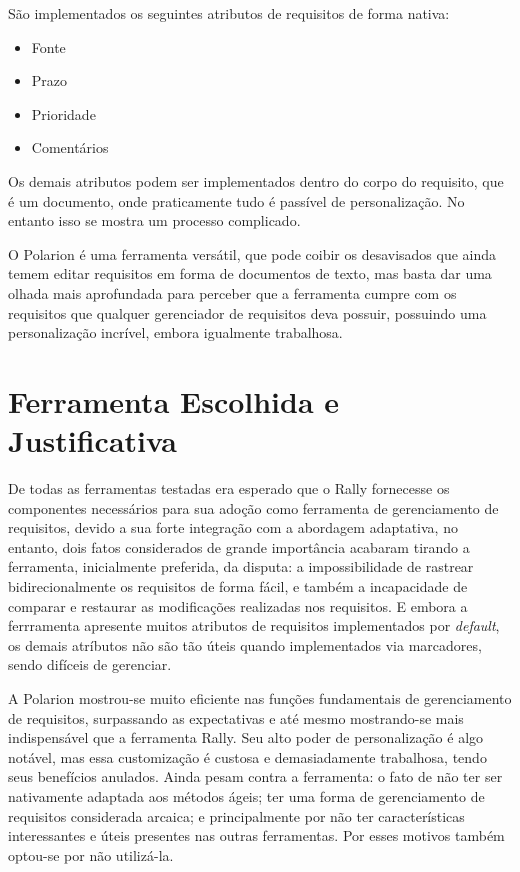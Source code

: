 São implementados os seguintes atributos de requisitos de forma nativa:

\begin{itemize}
  \item Fonte
  \item Prazo
  \item Prioridade
  \item Comentários
\end{itemize}

Os demais atributos podem ser implementados dentro do corpo do requisito, que é um documento, onde praticamente tudo é passível de personalização. No entanto isso se mostra um processo complicado.

O Polarion é uma ferramenta versátil, que pode coibir os desavisados que ainda temem editar requisitos em forma de documentos de texto, mas basta dar uma olhada mais aprofundada para perceber que a ferramenta cumpre com os requisitos que qualquer gerenciador de requisitos deva possuir, possuindo uma personalização incrível, embora igualmente trabalhosa.

\section{Ferramenta Escolhida e Justificativa}

De todas as ferramentas testadas era esperado que o Rally fornecesse os componentes necessários para sua adoção como ferramenta de gerenciamento de requisitos, devido a sua forte integração com a abordagem adaptativa, no entanto, dois fatos considerados de grande importância acabaram tirando a ferramenta, inicialmente preferida, da disputa: a impossibilidade de rastrear bidirecionalmente os requisitos de forma fácil, e também a incapacidade de comparar e restaurar as modificações realizadas nos requisitos. E embora a ferrramenta apresente muitos atributos de requisitos implementados por \emph{default}, os demais atríbutos não são tão úteis quando implementados via marcadores, sendo difíceis de gerenciar.

A Polarion mostrou-se muito eficiente nas funções fundamentais de gerenciamento de requisitos, surpassando as expectativas e até mesmo mostrando-se mais indispensável que a ferramenta Rally. Seu alto poder de personalização é algo notável, mas essa customização é custosa e demasiadamente trabalhosa, tendo seus benefícios anulados. Ainda pesam contra a ferramenta: o fato de não ter ser nativamente adaptada aos métodos ágeis; ter uma forma de gerenciamento de requisitos considerada arcaica; e principalmente por não ter características interessantes e úteis presentes nas outras ferramentas. Por esses motivos também optou-se por não utilizá-la.


